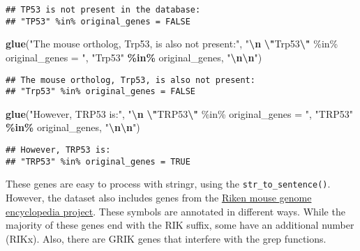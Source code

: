 \documentclass[
]{article}
\newenvironment{Shaded}{\begin{snugshade}}{\end{snugshade}}
\newcommand{\FunctionTok}[1]{\textcolor[rgb]{0.13,0.29,0.53}{\textbf{#1}}}
\newcommand{\NormalTok}[1]{#1}
\newcommand{\SpecialCharTok}[1]{\textcolor[rgb]{0.81,0.36,0.00}{\textbf{#1}}}
\newcommand{\StringTok}[1]{\textcolor[rgb]{0.31,0.60,0.02}{#1}}
\begin{document}
\begin{verbatim}
## TP53 is not present in the database:
## "TP53" %in% original_genes = FALSE
\end{verbatim}

\begin{Shaded}
\begin{Highlighting}[]
\FunctionTok{glue}\NormalTok{(}\StringTok{"The mouse ortholog, Trp53, is also not present:"}\NormalTok{, }\StringTok{"}\SpecialCharTok{\textbackslash{}n}\StringTok{ }\SpecialCharTok{\textbackslash{}"}\StringTok{Trp53}\SpecialCharTok{\textbackslash{}"}\StringTok{ \%in\% original\_genes = "}\NormalTok{, }
     \StringTok{"Trp53"} \SpecialCharTok{\%in\%}\NormalTok{ original\_genes, }\StringTok{"}\SpecialCharTok{\textbackslash{}n\textbackslash{}n}\StringTok{"}\NormalTok{)}
\end{Highlighting}
\end{Shaded}

\begin{verbatim}
## The mouse ortholog, Trp53, is also not present:
## "Trp53" %in% original_genes = FALSE
\end{verbatim}

\begin{Shaded}
\begin{Highlighting}[]
\FunctionTok{glue}\NormalTok{(}\StringTok{"However, TRP53 is:"}\NormalTok{, }\StringTok{"}\SpecialCharTok{\textbackslash{}n}\StringTok{ }\SpecialCharTok{\textbackslash{}"}\StringTok{TRP53}\SpecialCharTok{\textbackslash{}"}\StringTok{ \%in\% original\_genes = "}\NormalTok{, }
     \StringTok{"TRP53"} \SpecialCharTok{\%in\%}\NormalTok{ original\_genes, }\StringTok{"}\SpecialCharTok{\textbackslash{}n\textbackslash{}n}\StringTok{"}\NormalTok{)}
\end{Highlighting}
\end{Shaded}

\begin{verbatim}
## However, TRP53 is:
## "TRP53" %in% original_genes = TRUE
\end{verbatim}

These genes are easy to process with stringr, using the
\texttt{str\_to\_sentence()}. However, the dataset also includes genes
from the
\href{https://www.sciencedirect.com/science/article/pii/S1631069103002166?via\%3Dihub}{Riken
mouse genome encyclopedia project}. These symbols are annotated in
different ways. While the majority of these genes end with the RIK
suffix, some have an additional number (RIKx). Also, there are GRIK
genes that interfere with the grep functions.
\end{document}
